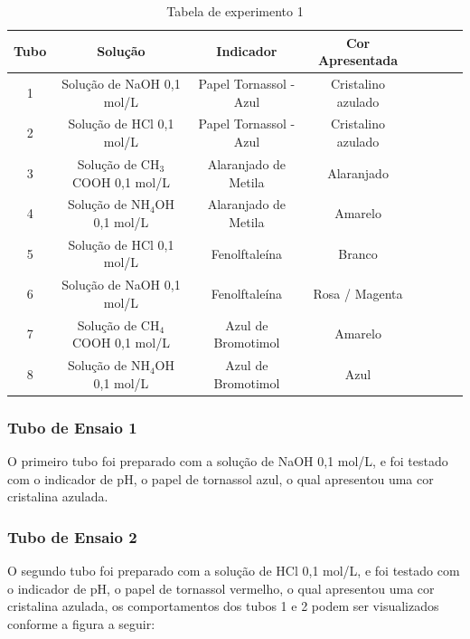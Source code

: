        \begin{table}[h]\label{tab:tubos}
            \label{tab:experimento1}
            \centering
            \begin{tabular}{|c|c|c|c|c|c|c|c|}
                \hline
                \textbf{Tubo} & \textbf{Solução} & \textbf{Indicador} & \textbf{Cor Apresentada}\\
                \hline
                1 & Solução de NaOH 0,1 mol/L & Papel Tornassol - Azul & Cristalino azulado \\
                \hline
                2 & Solução de HCl 0,1 mol/L & Papel Tornassol - Azul & Cristalino azulado \\
                \hline
                3 & Solução de CH$_3$COOH 0,1 mol/L & Alaranjado de Metila & Alaranjado\\
                \hline
                4 & Solução de NH$_4$OH 0,1 mol/L & Alaranjado de Metila & Amarelo \\
                \hline
                5 & Solução de HCl 0,1 mol/L & Fenolftaleína & Branco \\
                \hline
                6 & Solução de NaOH 0,1 mol/L & Fenolftaleína & Rosa / Magenta \\
                \hline
                7 & Solução de CH$_4$COOH 0,1 mol/L & Azul de Bromotimol & Amarelo \\
                \hline
                8 & Solução de NH$_4$OH 0,1 mol/L & Azul de Bromotimol & Azul \\
                \hline
            \end{tabular}
            \caption{Tabela de experimento 1}
        \end{table}
		
	\subsubsection{Tubo de Ensaio 1}
        \indent O primeiro tubo foi preparado com a solução de NaOH 0,1 mol/L, e foi testado com o indicador de pH, o papel de tornassol azul, o qual apresentou uma cor cristalina azulada.\\
        
	\subsubsection{Tubo de Ensaio 2}
        \indent O segundo tubo foi preparado com a solução de HCl 0,1 mol/L, e foi testado com o indicador de pH, o papel de tornassol vermelho, o qual apresentou uma cor cristalina azulada, os comportamentos dos tubos 1 e 2 podem ser visualizados conforme a figura a seguir:\\

